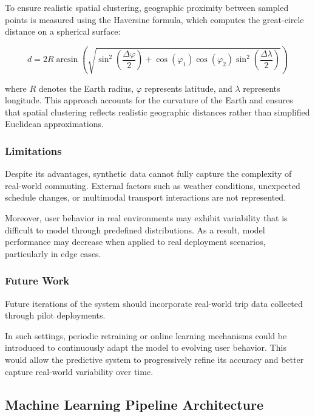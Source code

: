 To ensure realistic spatial clustering, geographic proximity between sampled points is measured using the Haversine formula, which computes the great-circle distance on a spherical surface:

\begin{equation}
d = 2R \arcsin\left(
\sqrt{
\sin^2\left(\frac{\Delta \varphi}{2}\right)
+
\cos(\varphi_1)\cos(\varphi_2)
\sin^2\left(\frac{\Delta \lambda}{2}\right)
}
\right)
\end{equation}

where $R$ denotes the Earth radius, $\varphi$ represents latitude, and $\lambda$ represents longitude. This approach accounts for the curvature of the Earth and ensures that spatial clustering reflects realistic geographic distances rather than simplified Euclidean approximations.

\subsubsection{Limitations}

Despite its advantages, synthetic data cannot fully capture the complexity of real-world commuting. External factors such as weather conditions, unexpected schedule changes, or multimodal transport interactions are not represented.

Moreover, user behavior in real environments may exhibit variability that is difficult to model through predefined distributions. As a result, model performance may decrease when applied to real deployment scenarios, particularly in edge cases.

\subsubsection{Future Work}

Future iterations of the system should incorporate real-world trip data collected through pilot deployments.

In such settings, periodic retraining or online learning mechanisms could be introduced to continuously adapt the model to evolving user behavior. This would allow the predictive system to progressively refine its accuracy and better capture real-world variability over time.
\subsection{Machine Learning Pipeline Architecture}


